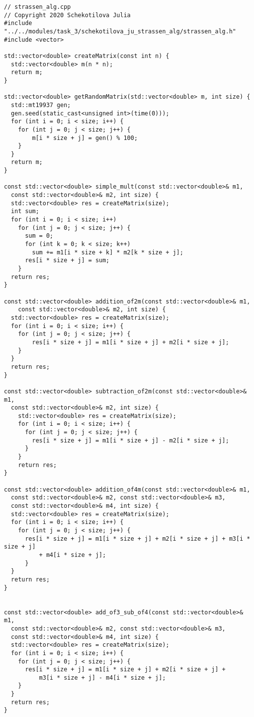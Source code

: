 \documentclass{report}
\begin{document}
\begin{lstlisting}
// strassen_alg.cpp
// Copyright 2020 Schekotilova Julia
#include "../../modules/task_3/schekotilova_ju_strassen_alg/strassen_alg.h"
#include <vector>

std::vector<double> createMatrix(const int n) {
  std::vector<double> m(n * n);
  return m;
}

std::vector<double> getRandomMatrix(std::vector<double> m, int size) {
  std::mt19937 gen;
  gen.seed(static_cast<unsigned int>(time(0)));
  for (int i = 0; i < size; i++) {
    for (int j = 0; j < size; j++) {
        m[i * size + j] = gen() % 100;
    }
  }
  return m;
}

const std::vector<double> simple_mult(const std::vector<double>& m1,
  const std::vector<double>& m2, int size) {
  std::vector<double> res = createMatrix(size);
  int sum;
  for (int i = 0; i < size; i++)
    for (int j = 0; j < size; j++) {
      sum = 0;
      for (int k = 0; k < size; k++)
        sum += m1[i * size + k] * m2[k * size + j];
      res[i * size + j] = sum;
    }
  return res;
}

const std::vector<double> addition_of2m(const std::vector<double>& m1,
    const std::vector<double>& m2, int size) {
  std::vector<double> res = createMatrix(size);
  for (int i = 0; i < size; i++) {
    for (int j = 0; j < size; j++) {
        res[i * size + j] = m1[i * size + j] + m2[i * size + j];
    }
  }
  return res;
}

const std::vector<double> subtraction_of2m(const std::vector<double>& m1,
  const std::vector<double>& m2, int size) {
    std::vector<double> res = createMatrix(size);
    for (int i = 0; i < size; i++) {
      for (int j = 0; j < size; j++) {
        res[i * size + j] = m1[i * size + j] - m2[i * size + j];
      }
    }
    return res;
}

const std::vector<double> addition_of4m(const std::vector<double>& m1,
  const std::vector<double>& m2, const std::vector<double>& m3,
  const std::vector<double>& m4, int size) {
  std::vector<double> res = createMatrix(size);
  for (int i = 0; i < size; i++) {
    for (int j = 0; j < size; j++) {
      res[i * size + j] = m1[i * size + j] + m2[i * size + j] + m3[i * size + j]
          + m4[i * size + j];
      }
  }
  return res;
}


const std::vector<double> add_of3_sub_of4(const std::vector<double>& m1,
  const std::vector<double>& m2, const std::vector<double>& m3,
  const std::vector<double>& m4, int size) {
  std::vector<double> res = createMatrix(size);
  for (int i = 0; i < size; i++) {
    for (int j = 0; j < size; j++) {
      res[i * size + j] = m1[i * size + j] + m2[i * size + j] +
          m3[i * size + j] - m4[i * size + j];
    }
  }
  return res;
}


\end{lstlisting}
\end{document}
